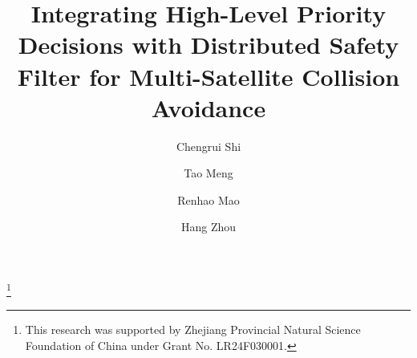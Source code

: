 \documentclass{ifacconf}
\begin{document}
\begin{frontmatter}

\title{Integrating High-Level Priority Decisions with Distributed Safety Filter for Multi-Satellite Collision Avoidance} 

\thanks[footnoteinfo]{This research was supported by Zhejiang Provincial Natural Science Foundation of China under Grant No. LR24F030001.}

\author[First]{Chengrui Shi} 
\author[Second]{Tao Meng} 
\author[First]{Renhao Mao}
\author[First]{Hang Zhou}

\address[First]{School of Aeronautics and Astronautics,  
Zhejiang University, Hangzhou, 310027, China (e-mail: chengruishi,maorh,zhou\_hang@zju.edu.cn).}
\address[Second]{Huanjiang Laboratory, 
   Zhuji, 311899, China (e-mail: mengtao@zju.edu.cn)}

\begin{abstract}                %


\end{abstract}
\end{frontmatter}
\end{document}
